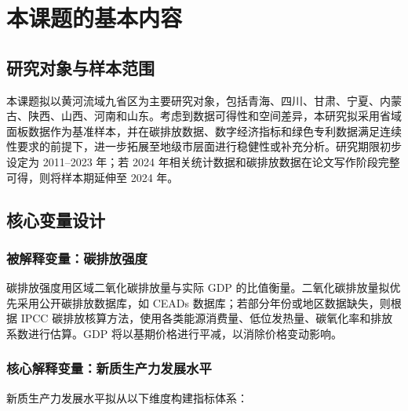 \documentclass[UTF8,a4paper,zihao=-4,fontset=windows]{ctexart}
\newcommand{\regionscope}{黄河流域}
\begin{document}
\section{本课题的基本内容}

\subsection{研究对象与样本范围}

本课题拟以\regionscope 九省区为主要研究对象，包括青海、四川、甘肃、宁夏、内蒙古、陕西、山西、河南和山东。考虑到数据可得性和空间差异，本研究拟采用省域面板数据作为基准样本，并在碳排放数据、数字经济指标和绿色专利数据满足连续性要求的前提下，进一步拓展至地级市层面进行稳健性或补充分析。研究期限初步设定为 2011--2023 年；若 2024 年相关统计数据和碳排放数据在论文写作阶段完整可得，则将样本期延伸至 2024 年。

\subsection{核心变量设计}

\subsubsection{被解释变量：碳排放强度}

碳排放强度用区域二氧化碳排放量与实际 GDP 的比值衡量。二氧化碳排放量拟优先采用公开碳排放数据库，如 CEADs 数据库；若部分年份或地区数据缺失，则根据 IPCC 碳排放核算方法，使用各类能源消费量、低位发热量、碳氧化率和排放系数进行估算。GDP 将以基期价格进行平减，以消除价格变动影响。

\subsubsection{核心解释变量：新质生产力发展水平}

新质生产力发展水平拟从以下维度构建指标体系：
\end{document}
